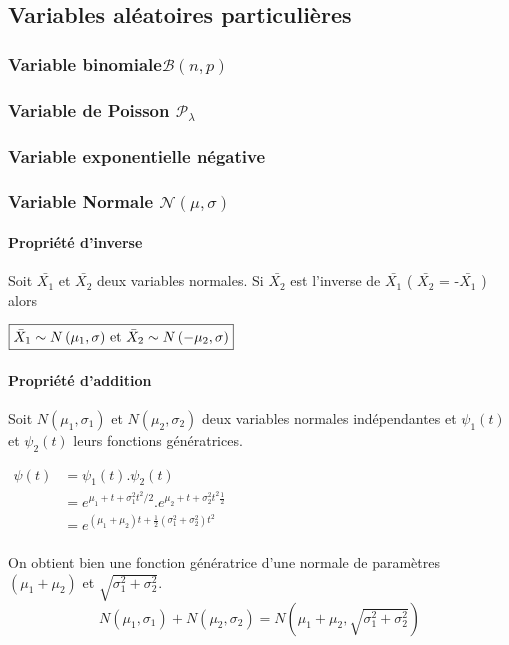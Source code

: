 \newpage
\subsection{Variables aléatoires particulières}


\subsubsection{Variable binomiale$\mathcal{B}(n,p)$}
\subsubsection{Variable de Poisson $\mathcal{P}_\lambda$}
\subsubsection{Variable exponentielle négative}
\subsubsection{Variable Normale $\mathcal{N}(\mu,\sigma)$}


\paragraph{Propriété d'inverse}
\label{propriete-normale-inverse}
Soit $\bar{X_1}$ et $\bar{X_2}$ deux variables normales. Si $\bar{X_2}$ est l'inverse de $\bar{X_1}$ ( $\bar{X_2}$ = -$\bar{X_1}$ ) alors
\begin{center}
$\boxed{\bar{X}_1 \sim N \left( \mu_1, \sigma \right)$ et $\bar{X}_2 \sim N \left( -\mu_2, \sigma \right)}$
\end{center}



\paragraph{Propriété d'addition}
\label{propriete-normale-addition}
Soit $N(\mu_1,\sigma_1)$ et $N(\mu_2,\sigma_2)$ deux variables normales indépendantes et $\psi_1(t)$ et $\psi_2(t)$ leurs fonctions génératrices.
\begin{center}
$\begin{array}{LL}
\psi(t) &= \psi_1(t).\psi_2(t)\\
        &= e^{\mu_1+t+\sigma_1^2t^2/2}.e^{\mu_2+t+\sigma_2^2t^2\frac{1}{2}}\\
        &= e^{(\mu_1+\mu_2)t+\frac{1}{2}(\sigma_1^2+\sigma_2^2)t^2}\\
\end{array}$
\end{center}
On obtient bien une fonction génératrice d'une normale de paramètres $(\mu_1+\mu_2)$ et $\sqrt{\sigma_1^2+\sigma_2^2}$.
$$\boxed{N(\mu_1,\sigma_1) + N(\mu_2,\sigma_2) = N\left(\mu_1+\mu_2,\sqrt{\sigma_1^2+\sigma_2^2}\right)}$$







